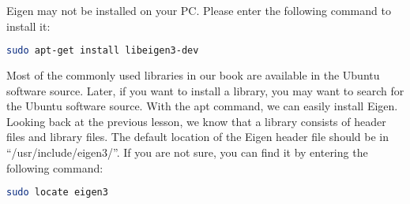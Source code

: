 Eigen may not be installed on your PC. Please enter the following command to install it:

\begin{lstlisting}[language=sh,caption=Terminal input:]
sudo apt-get install libeigen3-dev
\end{lstlisting}

Most of the commonly used libraries in our book are available in the Ubuntu software source. Later, if you want to install a library, you may want to search for the Ubuntu software source. With the apt command, we can easily install Eigen. Looking back at the previous lesson, we know that a library consists of header files and library files. The default location of the Eigen header file should be in ``/usr/include/eigen3/''. If you are not sure, you can find it by entering the following command:

\begin{lstlisting}[language=sh,caption=Terminal input:]
sudo locate eigen3
\end{lstlisting}

